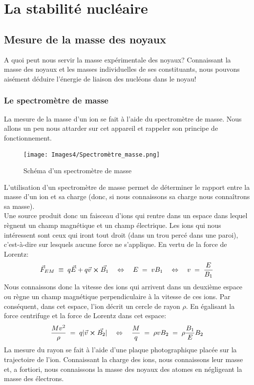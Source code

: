 \section{La stabilité nucléaire}

\subsection{Mesure de la masse des noyaux}

A quoi peut nous servir la masse expérimentale des noyaux? Connaissant la masse des noyaux et les masses individuelles de ses constituants, nous pouvons aisément déduire l'énergie de liaison des nucléons dans le noyau!

\subsubsection{Le spectromètre de masse}


La mesure de la masse d'un ion se fait à l'aide du spectromètre de masse. Nous allons un peu nous attarder sur cet appareil et rappeler son principe de fonctionnement.
 \begin{figure}[H]
    \centering
    \texttt{[image: Images4/Spectromètre\_masse.png]}
    \caption{Schéma d'un spectromètre de masse}
    \label{fig:Schéma_spectrometre_masse}
\end{figure}
L'utilisation d'un spectromètre de masse permet de déterminer le rapport entre la masse d'un ion et sa charge (donc, si nous connaissons sa charge nous connaîtrons sa masse).\\
Une source produit donc un faisceau d'ions qui rentre dans un espace dans lequel règnent un champ magnétique et un champ électrique. Les ions qui nous intéressent sont ceux qui iront tout droit (dans un trou percé dans une paroi), c'est-à-dire sur lesquels aucune force ne s'applique. En vertu de la force de Lorentz:
\begin{equation*}
    \vec{F}_{EM} \;\equiv\;
    q\vec{E} + q\vec{v}\cross\vec{B_1}
    \quad \Leftrightarrow \quad
    E\; = \; vB_1
    \quad \Leftrightarrow \quad
    v \; = \; \dfrac{E}{B_1}
\end{equation*}
Nous connaissons donc la vitesse des ions qui arrivent dans un deuxième espace ou règne un champ magnétique perpendiculaire à la vitesse de ces ions. Par conséquent, dans cet espace, l'ion décrit un cercle de rayon $\rho$. En égalisant la force centrifuge et la force de Lorentz dans cet espace:
\begin{equation*}
    \dfrac{Mv^2}{\rho} \; = \; q |\vec{v}\cross\vec{B_2}|
    \quad \Leftrightarrow \quad
    \dfrac{M}{q} \; = \; \rho v B_2 \; = \; \rho \dfrac{B_1}{E} B_2 
\end{equation*}
La mesure du rayon se fait à l'aide d'une plaque photographique placée sur la trajectoire de l'ion. Connaissant la charge des ions, nous connaissons leur masse et, a fortiori, nous connaissons la masse des noyaux des atomes en négligeant la masse des électrons.


